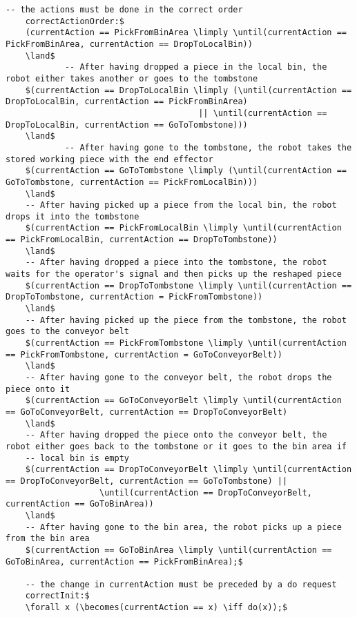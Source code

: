 \begin{lstlisting}[fontadjust, mathescape, frame=single]
    -- the actions must be done in the correct order
    correctActionOrder:$
    (currentAction == PickFromBinArea \limply \until(currentAction == PickFromBinArea, currentAction == DropToLocalBin))
    \land$
            -- After having dropped a piece in the local bin, the robot either takes another or goes to the tombstone
    $(currentAction == DropToLocalBin \limply (\until(currentAction == DropToLocalBin, currentAction == PickFromBinArea)
                                       || \until(currentAction == DropToLocalBin, currentAction == GoToTombstone)))
    \land$
            -- After having gone to the tombstone, the robot takes the stored working piece with the end effector
    $(currentAction == GoToTombstone \limply (\until(currentAction == GoToTombstone, currentAction == PickFromLocalBin)))
    \land$
    -- After having picked up a piece from the local bin, the robot drops it into the tombstone
    $(currentAction == PickFromLocalBin \limply \until(currentAction == PickFromLocalBin, currentAction == DropToTombstone))
    \land$
    -- After having dropped a piece into the tombstone, the robot waits for the operator's signal and then picks up the reshaped piece
    $(currentAction == DropToTombstone \limply \until(currentAction == DropToTombstone, currentAction = PickFromTombstone))
    \land$
    -- After having picked up the piece from the tombstone, the robot goes to the conveyor belt
    $(currentAction == PickFromTombstone \limply \until(currentAction == PickFromTombstone, currentAction = GoToConveyorBelt))
    \land$
    -- After having gone to the conveyor belt, the robot drops the piece onto it
    $(currentAction == GoToConveyorBelt \limply \until(currentAction == GoToConveyorBelt, currentAction == DropToConveyorBelt)
    \land$
    -- After having dropped the piece onto the conveyor belt, the robot either goes back to the tombstone or it goes to the bin area if 
    -- local bin is empty
    $(currentAction == DropToConveyorBelt \limply \until(currentAction == DropToConveyorBelt, currentAction == GoToTombstone) ||
                   \until(currentAction == DropToConveyorBelt, currentAction == GoToBinArea))
    \land$
    -- After having gone to the bin area, the robot picks up a piece from the bin area
    $(currentAction == GoToBinArea \limply \until(currentAction == GoToBinArea, currentAction == PickFromBinArea);$

    -- the change in currentAction must be preceded by a do request
    correctInit:$
    \forall x (\becomes(currentAction == x) \iff do(x));$


\end{lstlisting}
